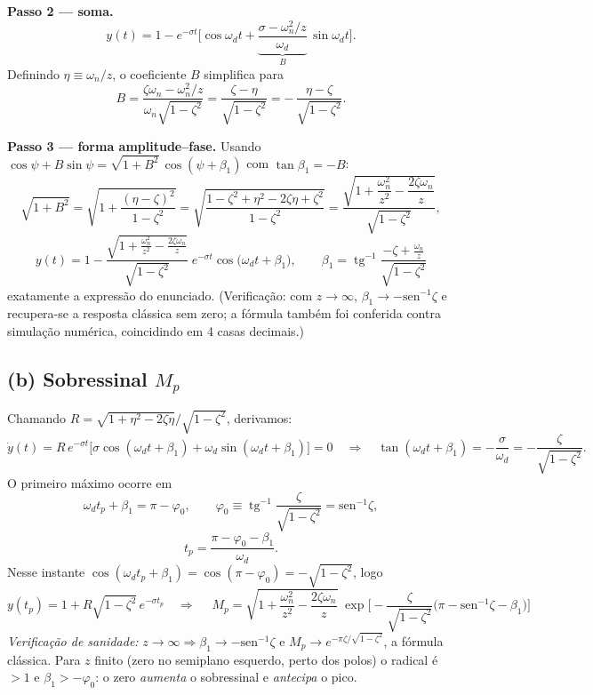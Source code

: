 \documentclass[11pt,a4paper]{article}
\newcommand{\atan}{\operatorname{tg}^{-1}}
\begin{document}
\textbf{Passo 2 --- soma.}
\[
y(t)=1-e^{-\sigma t}\Big[\cos\omega_d t
+\underbrace{\frac{\sigma-\omega_n^2/z}{\omega_d}}_{\textstyle B}\,\sin\omega_d t\Big].
\]
Definindo $\eta\equiv\omega_n/z$, o coeficiente $B$ simplifica para
\[
B=\frac{\zeta\omega_n-\omega_n^2/z}{\omega_n\sqrt{1-\zeta^2}}
=\frac{\zeta-\eta}{\sqrt{1-\zeta^2}}
=-\,\frac{\eta-\zeta}{\sqrt{1-\zeta^2}} .
\]

\textbf{Passo 3 --- forma amplitude--fase.} Usando
$\cos\psi+B\sin\psi=\sqrt{1+B^2}\,\cos(\psi+\beta_1)$ com $\tan\beta_1=-B$:
\[
\sqrt{1+B^2}
=\sqrt{1+\frac{(\eta-\zeta)^2}{1-\zeta^2}}
=\sqrt{\frac{1-\zeta^2+\eta^2-2\zeta\eta+\zeta^2}{1-\zeta^2}}
=\frac{\sqrt{1+\dfrac{\omega_n^2}{z^2}-\dfrac{2\zeta\omega_n}{z}}}{\sqrt{1-\zeta^2}} ,
\]
\[
\boxed{\;
y(t)=1-\frac{\sqrt{1+\frac{\omega_n^2}{z^2}-\frac{2\zeta\omega_n}{z}}}{\sqrt{1-\zeta^2}}\;
e^{-\sigma t}\cos\big(\omega_d t+\beta_1\big),
\qquad
\beta_1=\atan\!\frac{-\zeta+\frac{\omega_n}{z}}{\sqrt{1-\zeta^2}} \;}
\]
exatamente a express\~ao do enunciado. (Verifica\c{c}\~ao: com $z\to\infty$,
$\beta_1\to-\mathrm{sen}^{-1}\zeta$ e recupera-se a resposta cl\'assica sem zero;
a f\'ormula tamb\'em foi conferida contra simula\c{c}\~ao num\'erica, coincidindo em
4 casas decimais.)

\subsection*{(b) Sobressinal $M_p$}

Chamando $R=\sqrt{1+\eta^2-2\zeta\eta}\big/\sqrt{1-\zeta^2}$, derivamos:
\[
\dot y(t)=R\,e^{-\sigma t}\Big[\sigma\cos(\omega_d t+\beta_1)+\omega_d\sin(\omega_d t+\beta_1)\Big]=0
\quad\Longrightarrow\quad
\tan(\omega_d t+\beta_1)=-\frac{\sigma}{\omega_d}=-\frac{\zeta}{\sqrt{1-\zeta^2}} .
\]
O primeiro m\'aximo ocorre em
\[
\omega_d t_p+\beta_1=\pi-\varphi_0,
\qquad
\varphi_0\equiv\atan\frac{\zeta}{\sqrt{1-\zeta^2}}=\mathrm{sen}^{-1}\zeta ,
\]
\[
t_p=\frac{\pi-\varphi_0-\beta_1}{\omega_d} .
\]
Nesse instante $\cos(\omega_d t_p+\beta_1)=\cos(\pi-\varphi_0)=-\sqrt{1-\zeta^2}$, logo
\[
y(t_p)=1+R\sqrt{1-\zeta^2}\,e^{-\sigma t_p}
\quad\Longrightarrow\quad
\boxed{\;
M_p=\sqrt{1+\frac{\omega_n^2}{z^2}-\frac{2\zeta\omega_n}{z}}\;
\exp\!\Big[-\frac{\zeta}{\sqrt{1-\zeta^2}}\big(\pi-\mathrm{sen}^{-1}\zeta-\beta_1\big)\Big]\;}
\]
\emph{Verifica\c{c}\~ao de sanidade:} $z\to\infty\Rightarrow\beta_1\to-\mathrm{sen}^{-1}\zeta$
e $M_p\to e^{-\pi\zeta/\sqrt{1-\zeta^2}}$, a f\'ormula cl\'assica. Para $z$ finito
(zero no semiplano esquerdo, perto dos polos) o radical \'e $>1$ e $\beta_1>-\varphi_0$:
o zero \emph{aumenta} o sobressinal e \emph{antecipa} o pico.
\end{document}
